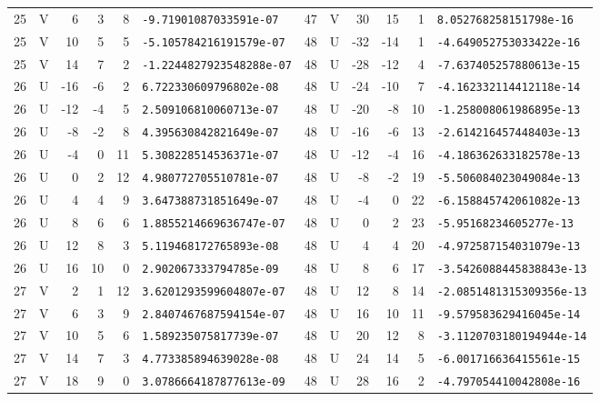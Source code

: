 \begin{longtable}{rcrrrl|rcrrrl}
25 & V & 6 & 3 & 8 & \texttt{-9.71901087033591e-07} & 47 & V & 30 & 15 & 1 & \texttt{8.052768258151798e-16}\\
25 & V & 10 & 5 & 5 & \texttt{-5.105784216191579e-07} & 48 & U & -32 & -14 & 1 & \texttt{-4.649052753033422e-16}\\
25 & V & 14 & 7 & 2 & \texttt{-1.2244827923548288e-07} & 48 & U & -28 & -12 & 4 & \texttt{-7.637405257880613e-15}\\
26 & U & -16 & -6 & 2 & \texttt{6.722330609796802e-08} & 48 & U & -24 & -10 & 7 & \texttt{-4.162332114412118e-14}\\
26 & U & -12 & -4 & 5 & \texttt{2.509106810060713e-07} & 48 & U & -20 & -8 & 10 & \texttt{-1.258008061986895e-13}\\
26 & U & -8 & -2 & 8 & \texttt{4.395630842821649e-07} & 48 & U & -16 & -6 & 13 & \texttt{-2.614216457448403e-13}\\
26 & U & -4 & 0 & 11 & \texttt{5.308228514536371e-07} & 48 & U & -12 & -4 & 16 & \texttt{-4.186362633182578e-13}\\
26 & U & 0 & 2 & 12 & \texttt{4.980772705510781e-07} & 48 & U & -8 & -2 & 19 & \texttt{-5.506084023049084e-13}\\
26 & U & 4 & 4 & 9 & \texttt{3.647388731851649e-07} & 48 & U & -4 & 0 & 22 & \texttt{-6.158845742061082e-13}\\
26 & U & 8 & 6 & 6 & \texttt{1.8855214669636747e-07} & 48 & U & 0 & 2 & 23 & \texttt{-5.95168234605277e-13}\\
26 & U & 12 & 8 & 3 & \texttt{5.119468172765893e-08} & 48 & U & 4 & 4 & 20 & \texttt{-4.972587154031079e-13}\\
26 & U & 16 & 10 & 0 & \texttt{2.902067333794785e-09} & 48 & U & 8 & 6 & 17 & \texttt{-3.5426088445838843e-13}\\
27 & V & 2 & 1 & 12 & \texttt{3.6201293599604807e-07} & 48 & U & 12 & 8 & 14 & \texttt{-2.0851481315309356e-13}\\
27 & V & 6 & 3 & 9 & \texttt{2.8407467687594154e-07} & 48 & U & 16 & 10 & 11 & \texttt{-9.579583629416045e-14}\\
27 & V & 10 & 5 & 6 & \texttt{1.589235075817739e-07} & 48 & U & 20 & 12 & 8 & \texttt{-3.1120703180194944e-14}\\
27 & V & 14 & 7 & 3 & \texttt{4.773385894639028e-08} & 48 & U & 24 & 14 & 5 & \texttt{-6.001716636415561e-15}\\
27 & V & 18 & 9 & 0 & \texttt{3.0786664187877613e-09} & 48 & U & 28 & 16 & 2 & \texttt{-4.797054410042808e-16}\\

\end{longtable}
